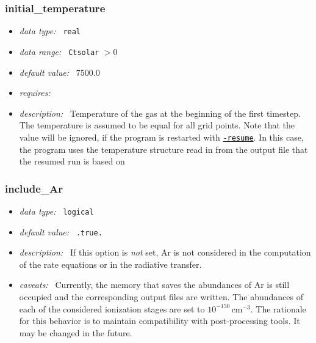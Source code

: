 \documentclass[a4paper,10pt]{article}
\begin{document}
\subsubsection{initial\_temperature}
\label{opt:initialtemperature}
\begin{itemize}
 \item \textit{data type:~} \texttt{real}
 \item \textit{data range:~} \texttt{Ctsolar} $> 0$
 \item \textit{default value:~} 7500.0
 \item \textit{requires:~}
 \item \textit{description:~} Temperature of the gas at the beginning of the 
  first timestep. The temperature is assumed to be equal for all grid points.
  Note that the value will be ignored, if the program is restarted with
  \texttt{\hyperref[sec:commandlineoptions]{-resume}}. In this case, the 
  program uses the temperature structure  read in from the output file that the 
  resumed run is  based on
\end{itemize}


\subsubsection{include\_Ar}
\label{opt:includear}
\begin{itemize}
 \item \textit{data type:~} \texttt{logical}
 \item \textit{default value:~} \texttt{.true.}
 \item \textit{description:~} If this option is 
 \textit{not} set, Ar is not considered 
 in the computation of the rate equations or in the
 radiative transfer. 
 \item \textit{caveats:~} Currently, the memory that saves the 
 abundances of Ar is still occupied and the corresponding output
 files are written. The abundances of each of the considered ionization
 stages are set to $10^{-150}\,\mathrm{cm^{-3}}$. The rationale for
 this behavior is to maintain compatibility with post-processing
 tools. It may be changed in the future.
\end{itemize}
\end{document}
